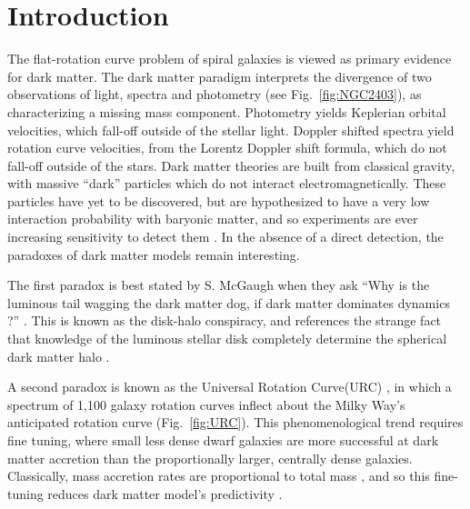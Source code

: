 \documentclass[reprint,%
 amsmath,amssymb,
 aps,
]{revtex4-1}
\begin{document}
\section{Introduction  \label{sec:uno}}



 The flat-rotation curve problem of spiral galaxies  is viewed as primary evidence for dark matter\cite{Rub,Bosma,1985ApJAlbada}. 
 The dark matter paradigm interprets the divergence of two    observations of light, spectra and photometry (see Fig.~\ref{fig:NGC2403}),     as characterizing a missing mass component. 
 Photometry yields Keplerian orbital velocities, which fall-off outside of the stellar light. Doppler shifted spectra yield rotation curve velocities, from the Lorentz Doppler shift formula, which do not fall-off outside of the stars.  
 Dark matter theories are built from classical gravity,   with massive
   ``dark'' particles  which do not interact electromagnetically.   These particles have   yet to be    discovered, but are hypothesized to have a very low interaction probability with baryonic matter, and so  experiments are ever increasing   sensitivity to detect them \cite{Cebrian:2022brv}. In the absence of a direct detection, the paradoxes of dark matter models remain interesting. 
   
   The first paradox is best stated by 
  S. McGaugh  when they ask   ``Why is the luminous tail wagging the dark matter dog,  if dark matter dominates dynamics ?'' \cite{1999McGaugh,McGaugh2016RAR}. This is known as the  disk-halo conspiracy, and references the strange fact that knowledge  of 
 the luminous stellar   disk  completely determine the spherical dark matter halo \cite{2004ApJ...609..652M}.  
 
 
 
 A second paradox  is known as  the Universal Rotation Curve(URC)  \cite{salucci,Persic,1978Rubin,10.1111/j.1365-2966.2007.11696.x}, in which  a spectrum of 1,100 galaxy rotation curves
 inflect  about  the Milky Way's  anticipated rotation curve (Fig.~\ref{fig:URC}).  This phenomenological trend requires   fine tuning, where
  small less dense  dwarf galaxies are more successful at dark matter accretion than   the   proportionally larger, centrally dense    galaxies. 
 Classically,  mass accretion rates are proportional to total mass \cite{10.1093/mnras/stt2403}, and so this fine-tuning reduces dark matter model's   
   predictivity   \cite{MCGAUGH2021220}. 
  
\end{document}
